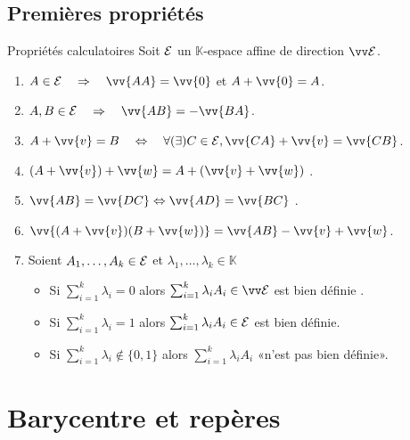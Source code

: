 \documentclass[bigger]{m53beamer}
\begin{document}
\subsection{Premières propriétés}
  \begin{frame}{Propriétés calculatoires}
    Soit $\mathcal{E}$ un $\mathbb{K}$-espace affine de direction $\ev{E}$.
    \begin{enumerate}[<+(1)->]
      \item $A \in \ens{E} \quad\Rightarrow\quad \vv{AA}=\vv{0}$ et $A+\vv{0}=A$.
      \item $A,B \in \ens{E} \quad\Rightarrow\quad \vv{AB}=-\vv{BA}$.
      \item $A+\vv{v}=B  \quad\Leftrightarrow\quad \forall (\exists) C \in \ens{E}, \vv{CA}+\vv{v}=\vv{CB}$.
      \item $(A+\vv{v})+\vv{w}=A+(\vv{v}+\vv{w})$ .
      \item $\vv{AB}=\vv{DC} \Leftrightarrow \vv{AD}=\vv{BC}$ .
      \item $\vv{(A+\vv{v})(B+\vv{w})}=\vv{AB}-\vv{v}+\vv{w}$.
      \item Soient $A_{1},\ldots,A_{k} \in \mathcal{E}$ et $\lambda_{1},\ldots,\lambda_{k} \in \mathbb{K}$
        \begin{itemize}[<+(1)->]
          \item Si $\sum_{i=1}^{k}\lambda_{i}=0$ alors $\sum_{i=1}^{k}\lambda_{i}A_{i} \in \ev{E}$ est bien définie .
          \item Si $\sum_{i=1}^{k}\lambda_{i}=1$ alors $\sum_{i=1}^{k}\lambda_{i}A_{i} \in \mathcal{E}$ est bien définie.
          \item Si $\sum_{i=1}^{k}\lambda_{i}\notin \{0,1\}$ alors $\sum_{i=1}^{k}\lambda_{i}A_{i}$ «n'est pas bien définie».
        \end{itemize}\pause
    \end{enumerate}
  \end{frame}
\section{Barycentre et repères}
\end{document}
